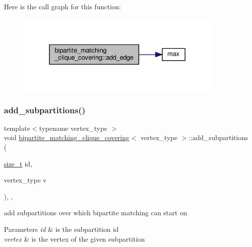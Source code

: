 Here is the call graph for this function\+:
\nopagebreak
\begin{figure}[H]
\begin{center}
\leavevmode
\includegraphics[width=288pt]{d1/df2/classbipartite__matching__clique__covering_abe8fd66049b25b749b5fa2e8254742cc_cgraph}
\end{center}
\end{figure}
\mbox{\label{classbipartite__matching__clique__covering_a25fd4df6e7216c827c3ff519350bef03}} 
\subsubsection{\texorpdfstring{add\+\_\+subpartitions()}{add\_subpartitions()}}
{\footnotesize\ttfamily template$<$typename vertex\+\_\+type $>$ \\
void \hyperlink{classbipartite__matching__clique__covering}{bipartite\+\_\+matching\+\_\+clique\+\_\+covering}$<$ vertex\+\_\+type $>$\+::add\+\_\+subpartitions (\begin{DoxyParamCaption}\item[{\hyperlink{tutorial__fpt__2017_2intro_2sixth_2test_8c_a7c94ea6f8948649f8d181ae55911eeaf}{size\+\_\+t}}]{id,  }\item[{vertex\+\_\+type}]{v }\end{DoxyParamCaption})\hspace{0.3cm}{\ttfamily [inline]}, {\ttfamily [override]}, {\ttfamily [virtual]}}



add subpartitions over which bipartite matching can start on 


\begin{DoxyParams}{Parameters}
{\em id} & is the subpartition id \\
\hline
{\em vertex} & is the vertex of the given subpartition \\
\hline
\end{DoxyParams}


